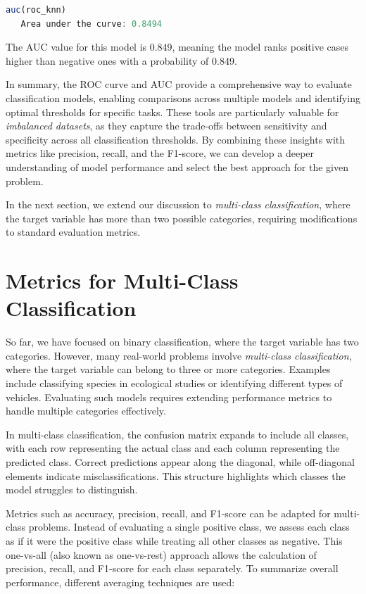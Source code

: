 \documentclass[
]{book}
\theoremstyle{definition}
\theoremstyle{definition}
\theoremstyle{definition}
\theoremstyle{definition}
\theoremstyle{remark}
\begin{document}
\begin{lstlisting}[language=R]
auc(roc_knn)
   Area under the curve: 0.8494
\end{lstlisting}

The AUC value for this model is 0.849, meaning the model ranks positive cases higher than negative ones with a probability of 0.849.

In summary, the ROC curve and AUC provide a comprehensive way to evaluate classification models, enabling comparisons across multiple models and identifying optimal thresholds for specific tasks. These tools are particularly valuable for \emph{imbalanced datasets}, as they capture the trade-offs between sensitivity and specificity across all classification thresholds. By combining these insights with metrics like precision, recall, and the F1-score, we can develop a deeper understanding of model performance and select the best approach for the given problem.

In the next section, we extend our discussion to \emph{multi-class classification}, where the target variable has more than two possible categories, requiring modifications to standard evaluation metrics.

\section{Metrics for Multi-Class Classification}\label{metrics-for-multi-class-classification}

So far, we have focused on binary classification, where the target variable has two categories. However, many real-world problems involve \emph{multi-class classification}, where the target variable can belong to three or more categories. Examples include classifying species in ecological studies or identifying different types of vehicles. Evaluating such models requires extending performance metrics to handle multiple categories effectively.

In multi-class classification, the confusion matrix expands to include all classes, with each row representing the actual class and each column representing the predicted class. Correct predictions appear along the diagonal, while off-diagonal elements indicate misclassifications. This structure highlights which classes the model struggles to distinguish.

Metrics such as accuracy, precision, recall, and F1-score can be adapted for multi-class problems. Instead of evaluating a single positive class, we assess each class as if it were the positive class while treating all other classes as negative. This one-vs-all (also known as one-vs-rest) approach allows the calculation of precision, recall, and F1-score for each class separately. To summarize overall performance, different averaging techniques are used:
\end{document}
